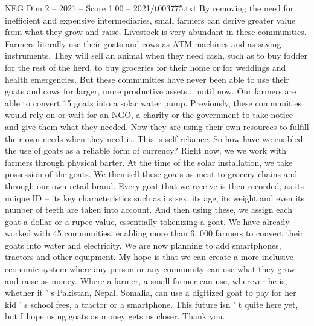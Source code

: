 \begin{textsample}{NEG Dim 2 – 2021 – Score 1.00 – 2021/t003775.txt}
By removing the need for inefficient and expensive intermediaries, small farmers can derive greater value from what they grow and raise.
Livestock is very abundant in these communities.
Farmers literally use their goats and cows as ATM machines and as saving instruments.
They will sell an animal when they need cash, such as to buy fodder for the rest of the herd, to buy groceries for their home or for weddings and health emergencies.
But these communities have never been able to use their goats and cows for larger, more productive assets... until now.
Our farmers are able to convert 15 goats into a solar water pump.
Previously, these communities would rely on or wait for an NGO, a charity or the government to take notice and give them what they needed.
Now they are using their own resources to fulfill their own needs when they need it.
This is self-reliance.
So how have we enabled the use of goats as a reliable form of currency?
Right now, we we work with farmers through physical barter.
At the time of the solar installation, we take possession of the goats.
We then sell these goats as meat to grocery chains and through our own retail brand.
Every goat that we receive is then recorded, as its unique ID -- its key characteristics such as its sex, its age, its weight and even its number of teeth are taken into account.
And then using these, we assign each goat a dollar or a rupee value, essentially tokenizing a goat.
We have already worked with 45 communities, enabling more than 6, 000 farmers to convert their goats into water and electricity.
We are now planning to add smartphones, tractors and other equipment.
My hope is that we can create a more inclusive economic system where any person or any community can use what they grow and raise as money.
Where a farmer, a small farmer can use, wherever he is, whether it ' s Pakistan, Nepal, Somalia, can use a digitized goat to pay for her kid ' s school fees, a tractor or a smartphone.
This future isn ' t quite here yet, but I hope using goats as money gets us closer.
Thank you.

\end{textsample}
